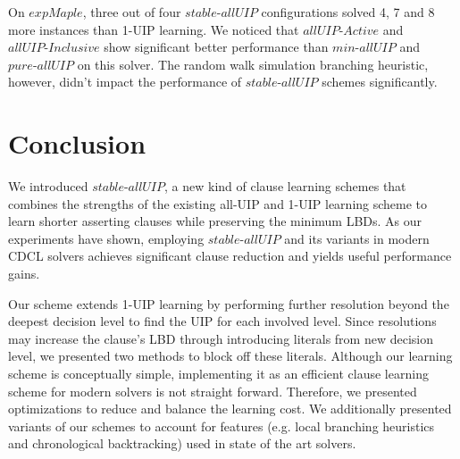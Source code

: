 \documentclass[runningheads]{llncs}
\newcommand{\allUip}{\textit{stable-allUIP}}
\newcommand{\allUipPure}{\textit{pure-allUIP}\xspace}
\newcommand{\allUipMin}{\textit{min-allUIP}\xspace}
\newcommand{\allUipAct}{\textit{allUIP-Active}}
\newcommand{\allUipIn}{\textit{allUIP-Inclusive}}
\newcommand{\expSATShort}{\textit{expMaple} }
\begin{document}

On $\expSATShort$, three out of four $\allUip$ configurations solved
4, 7 and 8 more instances than 1-UIP learning. We noticed that
$\allUipAct$ and $\allUipIn$ show significant better performance than
$\allUipMin$ and $\allUipPure$ on this solver. The random walk
simulation branching heuristic, however, didn't impact the performance
of $\allUip$ schemes significantly.

\section{Conclusion}We introduced $\allUip$, a new kind of clause learning schemes that combines the strengths of the existing all-UIP and 1-UIP learning scheme to learn shorter asserting clauses while preserving the minimum LBDs. As our experiments have shown, employing $\allUip$ and its variants in modern CDCL solvers achieves significant clause reduction and yields useful performance gains.  

Our scheme extends 1-UIP learning by performing further resolution beyond the deepest decision level to find the UIP for each involved level. Since resolutions may increase the clause's LBD through introducing literals from new decision level, we presented two methods to block off these literals. Although our learning scheme is conceptually simple, implementing it as an efficient clause learning scheme for modern solvers is not straight forward. Therefore, we presented optimizations to reduce and balance the learning cost. We additionally presented variants of our schemes to account for features (e.g. local branching heuristics and chronological backtracking) used in state of the art solvers.
\end{document}
